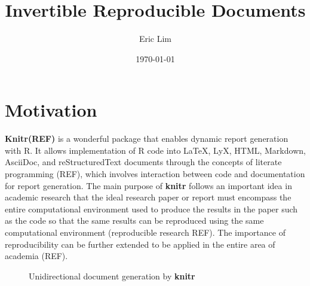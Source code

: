 \documentclass[a4paper, 12pt]{report}
\title{\textbf{Invertible Reproducible Documents}}
\author{Eric Lim}
\date{\today}
\begin{document}
  \maketitle


\chapter{Motivation}
\label{ch:motiv}


\textbf{Knitr(REF)} is a wonderful package that enables dynamic report generation with R. It allows implementation of R code into LaTeX, LyX, HTML, Markdown, AsciiDoc, and reStructuredText documents through the concepts of literate programming (REF), which involves interaction between code and documentation for report generation. The main purpose of \textbf{knitr} follows an important idea in academic research that the ideal research paper or report must encompass the entire computational environment used to produce the results in the paper such as the code so that the same results can be reproduced using the same computational environment (reproducible research REF). The importance of reproducibility can be further extended to be applied in the entire area of academia (REF). %

\begin{figure}[h]
\centering
  \caption{Unidirectional document generation by \textbf{knitr}}
  \label{fig:1}
\end{figure}
\end{document}

